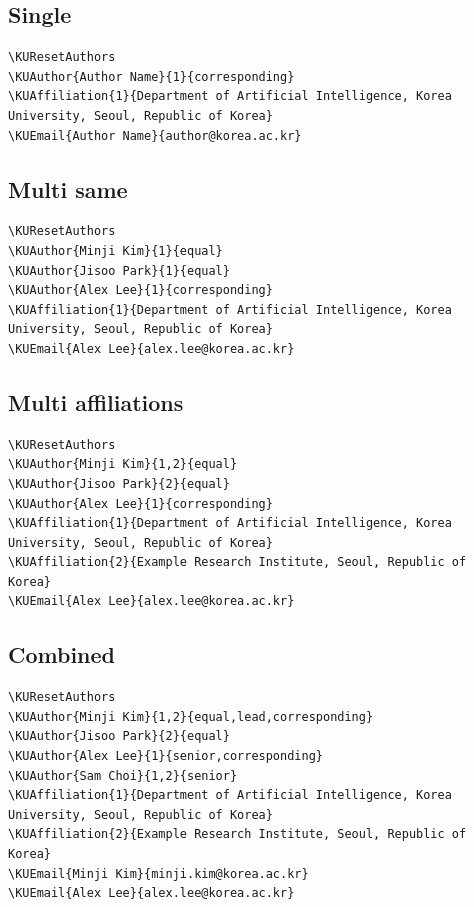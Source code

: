 \subsection{Single}
\begin{lstlisting}[style=promptstyle]
% Illustrative metadata; replace all placeholder identities.
\KUResetAuthors
\KUAuthor{Author Name}{1}{corresponding}
\KUAffiliation{1}{Department of Artificial Intelligence, Korea University, Seoul, Republic of Korea}
\KUEmail{Author Name}{author@korea.ac.kr}
\end{lstlisting}

\subsection{Multi same}
\begin{lstlisting}[style=promptstyle]
% Illustrative metadata; replace all placeholder identities.
\KUResetAuthors
\KUAuthor{Minji Kim}{1}{equal}
\KUAuthor{Jisoo Park}{1}{equal}
\KUAuthor{Alex Lee}{1}{corresponding}
\KUAffiliation{1}{Department of Artificial Intelligence, Korea University, Seoul, Republic of Korea}
\KUEmail{Alex Lee}{alex.lee@korea.ac.kr}
\end{lstlisting}

\subsection{Multi affiliations}
\begin{lstlisting}[style=promptstyle]
% Illustrative metadata; replace all placeholder identities.
\KUResetAuthors
\KUAuthor{Minji Kim}{1,2}{equal}
\KUAuthor{Jisoo Park}{2}{equal}
\KUAuthor{Alex Lee}{1}{corresponding}
\KUAffiliation{1}{Department of Artificial Intelligence, Korea University, Seoul, Republic of Korea}
\KUAffiliation{2}{Example Research Institute, Seoul, Republic of Korea}
\KUEmail{Alex Lee}{alex.lee@korea.ac.kr}
\end{lstlisting}

\subsection{Combined}
\begin{lstlisting}[style=promptstyle]
% Illustrative metadata; replace all placeholder identities.
\KUResetAuthors
\KUAuthor{Minji Kim}{1,2}{equal,lead,corresponding}
\KUAuthor{Jisoo Park}{2}{equal}
\KUAuthor{Alex Lee}{1}{senior,corresponding}
\KUAuthor{Sam Choi}{1,2}{senior}
\KUAffiliation{1}{Department of Artificial Intelligence, Korea University, Seoul, Republic of Korea}
\KUAffiliation{2}{Example Research Institute, Seoul, Republic of Korea}
\KUEmail{Minji Kim}{minji.kim@korea.ac.kr}
\KUEmail{Alex Lee}{alex.lee@korea.ac.kr}
\end{lstlisting}

